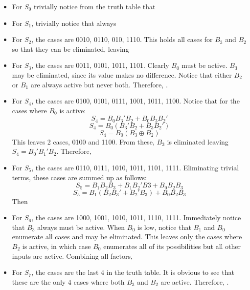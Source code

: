 \documentclass{article}
\begin{document}
\begin{enumerate}
        \begin{itemize}
            \item For $S_0$ trivially notice from the truth table that 
            \item For $S_1$, trivially notice that  always
            \item For $S_2$, the cases are 0010, 0110, 010, 1110. This holds all
            cases for $B_3$ and $B_2$ so that they can be eliminated, leaving
            \item For $S_3$, the cases are 0011, 0101, 1011, 1101. Clearly $B_0$
            must be active. $B_3$ may be eliminated, since its value makes no 
            difference. Notice that either $B_2$ or $B_1$ are always active but
            never both. Therefore, .
            \item For $S_4$, the cases are 0100, 0101, 0111, 1001, 1011, 1100.
            Notice that for the cases where $B_0$ is active:
            \[S_4 = B_0B_3'B_2 + B_0B_3B_2'\]
            \[S_4 = B_0(B_3'B_2+B_3B_2')\]
            \[S_4 = B_0(B_3 \oplus B_2)\]
            This leaves 2 cases, 0100 and 1100. From these, $B_3$ is eliminated
            leaving $S_4 = B_0'B_1'B_2$. Therefore, 
            \item For $S_5$, the cases are 0110, 0111, 1010, 1011, 1101, 1111. 
            Eliminating trivial terms, these cases are summed up as follows:
            \[S_5 = B_1B_2B_3 + B_1B_2'B3 + B_0B_2B_3\]
            \[S_5 = B_1(B_2B_3'+B_2'B_3) + B_0B_2B_3\]
            Then 
            \item For $S_6$, the cases are 1000, 1001, 1010, 1011, 1110, 1111.
            Immediately notice that $B_3$ always must be active. When $B_0$ is 
            low, notice that $B_1$ and $B_0$ enumerate all cases and may be
            eliminated. This leaves only the cases where $B_2$ is active, in 
            which case $B_0$ enumerates all of its possibilities but all other 
            inputs are active. Combining all factors, 
            \item For $S_7$, the cases are the last 4 in the truth table. It is 
            obvious to see that these are the only 4 cases where both $B_3$ and
            $B_2$ are active. Therefore, .
        \end{itemize}

\end{enumerate}
\end{document}
